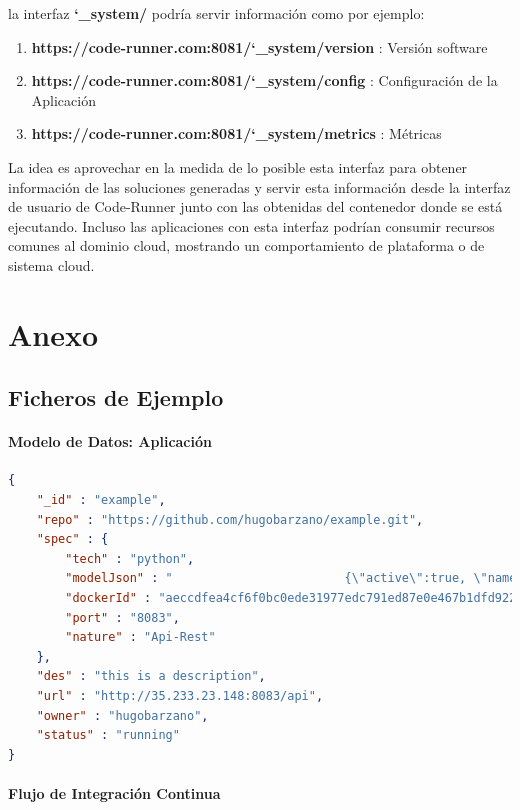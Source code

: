 \documentclass[a4paper,11pt]{book}
\begin{document}
la interfaz \textbf{\char`_system/} podría servir información como por ejemplo:

\begin{enumerate}
\item\textbf{ https://code-runner.com:8081/\char`_system/version }: Versión software
\item \textbf{https://code-runner.com:8081/\char`_system/config }: Configuración de la Aplicación
\item \textbf{https://code-runner.com:8081/\char`_system/metrics }: Métricas 
\end{enumerate}

La idea es aprovechar en la medida de lo posible esta interfaz para obtener información de las soluciones generadas y servir esta información desde la interfaz de usuario de Code-Runner junto con las obtenidas del contenedor donde se está ejecutando. Incluso las aplicaciones con esta interfaz podrían consumir recursos comunes al dominio cloud, mostrando un comportamiento de plataforma o de sistema cloud. 

\chapter{ Anexo}

\section{Ficheros de Ejemplo}

\subsubsection{Modelo de Datos:  Aplicación}\label{anexmodel}


\begin{lstlisting}[language=json,firstnumber=1]
{
    "_id" : "example",
    "repo" : "https://github.com/hugobarzano/example.git",
    "spec" : {
        "tech" : "python",
        "modelJson" : "                        {\"active\":true, \"name\":\"thing name\", \"value\":33}\r\n                    ",
        "dockerId" : "aeccdfea4cf6f0bc0ede31977edc791ed87e0e467b1dfd9222005e63feff8598",
        "port" : "8083",
        "nature" : "Api-Rest"
    },
    "des" : "this is a description",
    "url" : "http://35.233.23.148:8083/api",
    "owner" : "hugobarzano",
    "status" : "running"
}
\end{lstlisting}

\subsubsection{Flujo de Integración Continua}\label{anexci}
\end{document}
